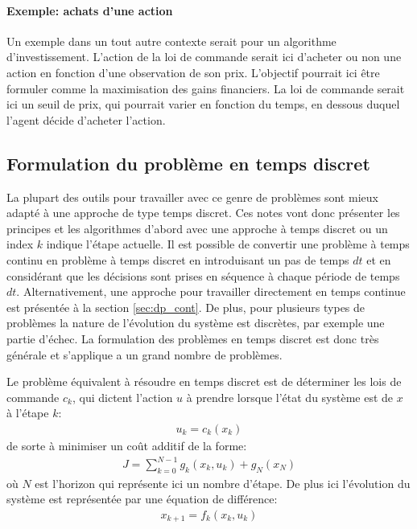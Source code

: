 \paragraph{Exemple: achats d'une action}

Un exemple dans un tout autre contexte serait pour un algorithme d'investissement. L'action de la loi de commande serait ici d'acheter ou non une action en fonction d'une observation de son prix. L'objectif pourrait ici être formuler comme la maximisation des gains financiers. La loi de commande serait ici un seuil de prix, qui pourrait varier en fonction du temps, en dessous duquel l'agent décide d'acheter l'action.


\newpage
\subsection{Formulation du problème en temps discret}


La plupart des outils pour travailler avec ce genre de problèmes sont mieux adapté à une approche de type temps discret. Ces notes vont donc présenter les principes et les algorithmes d'abord avec une approche à temps discret ou un index $k$ indique l'étape actuelle. Il est possible de convertir une problème à temps continu en problème à temps discret en introduisant un pas de temps $dt$ et en considérant que les décisions sont prises en séquence à chaque période de temps $dt$. Alternativement, une approche pour travailler directement en temps continue est présentée à la section \ref{sec:dp_cont}. De plus, pour plusieurs types de problèmes la nature de l'évolution du système est discrètes, par exemple une partie d'échec. La formulation des problèmes en temps discret est donc très générale et s'applique a un grand nombre de problèmes.

Le problème équivalent à résoudre en temps discret est de déterminer les lois de commande $c_k$, qui dictent l'action $u$ à prendre lorsque l'état du système est de $x$ à l'étape $k$:
\begin{align}
u_k = c_k( x_k )
\end{align}
de sorte à minimiser un coût additif de la forme:
\begin{align}
    J = \sum_{k=0}^{N-1} g_k(x_k, u_k) + g_N( x_N )
\end{align}
où $N$ est l'horizon qui représente ici un nombre d'étape. De plus ici l'évolution du système est représentée par une équation de différence:
\begin{align}
    x_{k+1} = f_k( x_k, u_k)
\end{align}

